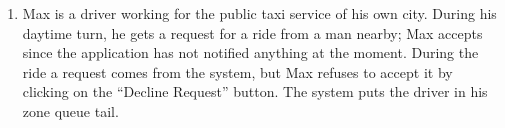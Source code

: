 \begin{enumerate}
\item Max is a driver working for the public taxi service of his own city. During his daytime turn, he gets a request for a ride from a man nearby; Max accepts since the application has not notified anything at the moment. During the ride a request comes from the system, but Max refuses to accept it by clicking on the “Decline Request” button. The system puts the driver in his zone queue tail. 

\end{enumerate}


\subsection{}
\subsection{}
